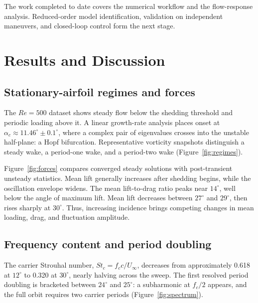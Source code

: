 The work completed to date covers the numerical workflow and the flow-response analysis. Reduced-order model identification, validation on independent maneuvers, and closed-loop control form the next stage.

\section{Results and Discussion}
\subsection{Stationary-airfoil regimes and forces}
The $Re=500$ dataset shows steady flow below the shedding threshold and periodic loading above it. A linear growth-rate analysis places onset at $\alpha_c\approx11.46^\circ\pm0.1^\circ$, where a complex pair of eigenvalues crosses into the unstable half-plane: a Hopf bifurcation. Representative vorticity snapshots distinguish a steady wake, a period-one wake, and a period-two wake (Figure~\ref{fig:regimes}).


Figure~\ref{fig:forces} compares converged steady solutions with post-transient unsteady statistics. Mean lift generally increases after shedding begins, while the oscillation envelope widens. The mean lift-to-drag ratio peaks near $14^\circ$, well below the angle of maximum lift. Mean lift decreases between $27^\circ$ and $29^\circ$, then rises sharply at $30^\circ$. Thus, increasing incidence brings competing changes in mean loading, drag, and fluctuation amplitude.


\subsection{Frequency content and period doubling}
The carrier Strouhal number, $St_c=f_cc/U_\infty$, decreases from approximately 0.618 at $12^\circ$ to 0.320 at $30^\circ$, nearly halving across the sweep. The first resolved period doubling is bracketed between $24^\circ$ and $25^\circ$: a subharmonic at $f_c/2$ appears, and the full orbit requires two carrier periods (Figure~\ref{fig:spectrum}).

